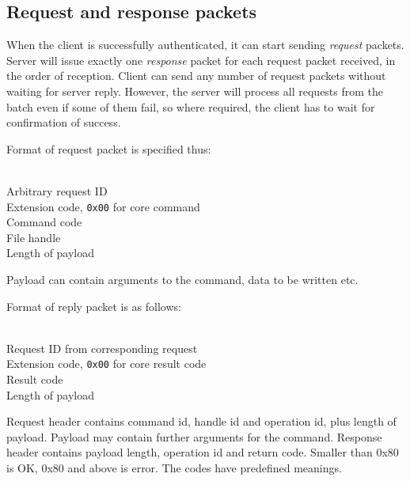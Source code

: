 %

\subsection{Request and response packets}

When the client is successfully authenticated, it can start sending {\it request} packets. Server will issue
exactly one {\it response} packet for each request packet received, in the order of reception. Client can send
any number of request packets without waiting for server reply. However, the server will process all requests
from the batch even if some of them fail, so where required, the client has to wait for confirmation of
success.

\begin{samepage}
Format of request packet is specified thus:
\begin{description}[parsep=1pt]
	 \hfill \\
		Arbitrary request ID
	 \hfill \\
		Extension code, {\tt 0x00} for core command
	 \hfill \\
		Command code
	 \hfill \\
		File handle
	 \hfill \\
		Length of payload
\end{description}
Payload can contain arguments to the command, data to be written etc.
\end{samepage}

\begin{samepage}
Format of reply packet is as follows:
\begin{description}[parsep=1pt]
	 \hfill \\
		Request ID from corresponding request
	 \hfill \\
		Extension code, {\tt 0x00} for core result code
	 \hfill \\
		Result code
	 \hfill \\
		Length of payload
\end{description}
\end{samepage}

Request header contains command id, handle id and operation id, plus length of payload. Payload may contain
further arguments for the command. Response header contains payload length, operation id and return code.
Smaller than 0x80 is OK, 0x80 and above is error.  The codes have predefined meanings.

